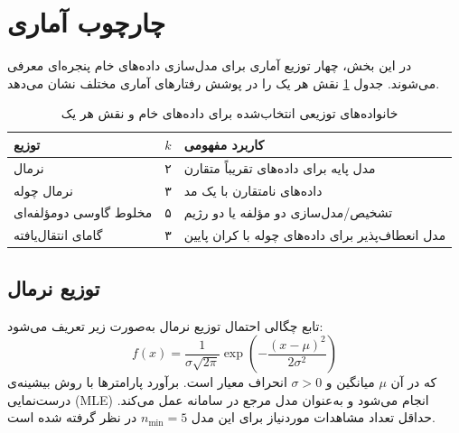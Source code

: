 \documentclass[12pt,a4paper,twocolumn]{article}
\begin{document}
\section{چارچوب آماری}

در این بخش، چهار توزیع آماری برای مدل‌سازی داده‌های خام پنجره‌ای معرفی می‌شوند. جدول \ref{tab:distributions} نقش هر یک را در پوشش رفتارهای آماری مختلف نشان می‌دهد.

\begin{table}[h]
\centering
\caption{خانواده‌های توزیعی انتخاب‌شده برای داده‌های خام و نقش هر یک}
\label{tab:distributions}
\begin{tabular}{l c p{6cm}}
\toprule
\textbf{توزیع} & \textbf{$k$} & \textbf{کاربرد مفهومی} \\
\midrule
نرمال & ۲ & مدل پایه برای داده‌های تقریباً متقارن \\
نرمال چوله & ۳ & داده‌های نامتقارن با یک مد \\
مخلوط گاوسی دومؤلفه‌ای & ۵ & تشخیص/مدل‌سازی دو مؤلفه یا دو رژیم \\
گامای انتقال‌یافته & ۳ & مدل انعطاف‌پذیر برای داده‌های چوله با کران پایین \\
\bottomrule
\end{tabular}
\end{table}

\subsection{توزیع نرمال}
تابع چگالی احتمال توزیع نرمال به‌صورت زیر تعریف می‌شود:
\begin{equation}
f(x) = \frac{1}{\sigma\sqrt{2\pi}}\exp\left( - \frac{(x - \mu)^{2}}{2\sigma^{2}} \right)
\end{equation}
که در آن $\mu$ میانگین و $\sigma>0$ انحراف معیار است. برآورد پارامترها با روش بیشینه‌ی درست‌نمایی (MLE) انجام می‌شود و به‌عنوان مدل مرجع در سامانه عمل می‌کند. حداقل تعداد مشاهدات موردنیاز برای این مدل $n_{\min}=5$ در نظر گرفته شده است.
\end{document}
